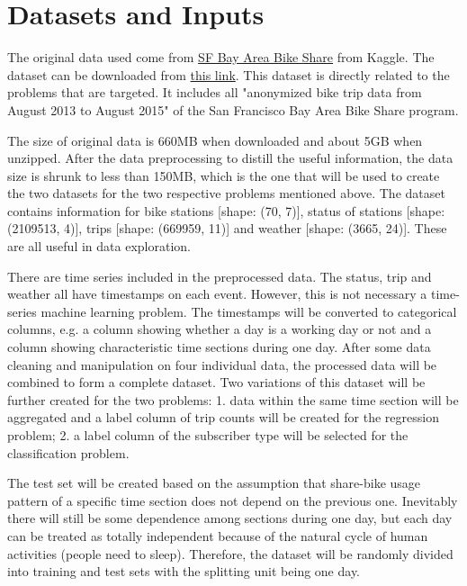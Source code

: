 \documentclass[a4paper]{article}
\begin{document}
	\section*{Datasets and Inputs}
	
	The original data used come from \href{https://www.kaggle.com/benhamner/sf-bay-area-bike-share}{SF Bay Area Bike Share} from Kaggle. The dataset can be downloaded from \href{(https://www.kaggle.com/benhamner/sf-bay-area-bike-share/downloads/sf-bay-area-bike-share.zip)}{this link}. This dataset is directly related to the problems that are targeted. It includes all "anonymized bike trip data from August 2013 to August 2015" of the San Francisco Bay Area Bike Share program.
		
	The size of original data is 660MB when downloaded and about 5GB when unzipped.  After the data preprocessing to distill the useful information, the data size is shrunk to less than 150MB, which is the one that will be used to create the two datasets for the two respective problems mentioned above. The dataset contains information for bike stations [shape: (70, 7)], status of stations [shape: (2109513, 4)], trips [shape: (669959, 11)] and weather [shape: (3665, 24)]. These are all useful in data exploration.
	
	There are time series included in the preprocessed data. The status, trip and weather all have timestamps on each event. However, this is not necessary a time-series machine learning problem. The timestamps will be converted to categorical columns, e.g. a column showing whether a day is a working day or not and a column showing characteristic time sections during one day. After some data cleaning and manipulation on four individual data, the processed data will be combined to form a complete dataset. Two variations of this dataset will be further created for the two problems: 1. data within the same time section will be aggregated and a label column of trip counts will be created for the regression problem; 2. a label column of the subscriber type will be selected for the classification problem.
	
	The test set will be created based on the assumption that share-bike usage pattern of a specific time section does not depend on the previous one. Inevitably there will still be some dependence among sections during one day, but each day can be treated as totally independent because of the natural cycle of human activities (people need to sleep). Therefore, the dataset will be randomly divided into training and test sets with the splitting unit being one day. 
	
\end{document}
